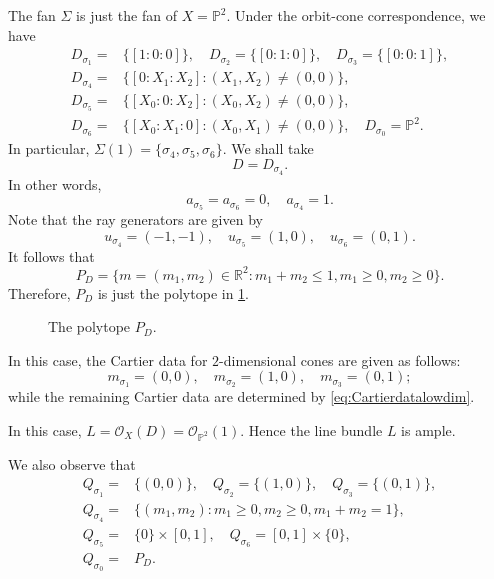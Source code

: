 \begin{example}
    The fan $\Sigma$ is just the fan of $X=\mathbb{P}^2$. Under the orbit-cone correspondence, we have
    \[
    \begin{aligned}
    D_{\sigma_1}=& \{[1:0:0]\},\quad D_{\sigma_2}=\{[0:1:0]\},\quad D_{\sigma_3}=\{[0:0:1]\},\\
    D_{\sigma_4}=& \{[0:X_1:X_2]:(X_1,X_2)\neq (0,0)\},\\
    D_{\sigma_5}=& \{[X_0:0:X_2]:(X_0,X_2)\neq (0,0)\},\\
    D_{\sigma_6}=& \{[X_0:X_1:0]:(X_0,X_1)\neq (0,0)\},\quad
    D_{\sigma_0}=\mathbb{P}^2.
    \end{aligned}
    \]
    In particular, $\Sigma(1)=\{\sigma_4,\sigma_5,\sigma_6\}$.
    We shall take
    \[
    D=D_{\sigma_4}.
    \]
    In other words,
    \[
    a_{\sigma_5}=a_{\sigma_6}=0,\quad a_{\sigma_4}=1.
    \]
    Note that the ray generators are given by
    \[
    u_{\sigma_4}=(-1,-1),\quad u_{\sigma_5}=(1,0),\quad u_{\sigma_6}=(0,1).
    \]
    It follows that
    \[
    P_D=\{m=(m_1,m_2)\in \mathbb{R}^2: m_1+m_2\leq 1, m_1\geq 0, m_2\geq 0\}.
    \]
    Therefore, $P_D$ is just the polytope in \cref{fig:polyP2}.
        \begin{figure}[ht]
        \centering
        \caption{The polytope $P_D$.}
        \label{fig:polyP2}
    \end{figure}
    In this case, the Cartier data for $2$-dimensional cones are given as follows:
    \[
    m_{\sigma_1}=(0,0),\quad m_{\sigma_2}=(1,0),\quad m_{\sigma_3}=(0,1);
    \]
    while the remaining Cartier data are determined by \eqref{eq:Cartierdatalowdim}.

    In this case, $L=\mathcal{O}_X(D)=\mathcal{O}_{\mathbb{P}^2}(1)$. Hence the line bundle $L$ is ample.

    We also observe that
    \[
    \begin{aligned}
    Q_{\sigma_1}=&\{(0,0)\},\quad Q_{\sigma_2}=\{(1,0)\},\quad Q_{\sigma_3}=\{(0,1)\},\\
    Q_{\sigma_4}=& \{(m_1,m_2):m_1\geq 0,m_2\geq 0,m_1+m_2=1\},\\
    Q_{\sigma_5}=& \{0\}\times [0,1],\quad Q_{\sigma_6}= [0,1]\times \{0\},\\
    Q_{\sigma_0}=& P_D.
    \end{aligned}
    \]
\end{example}

